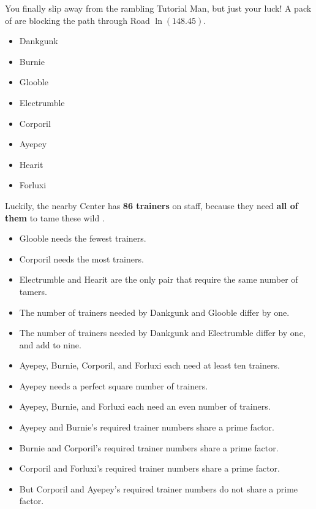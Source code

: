 

You finally slip away from the rambling Tutorial Man, but just your luck!
A pack of \mappMobimon{} are blocking the path
through Road \(\ln(148.45)\).

\begin{multicols}{2}
\begin{itemize}
  \item {Dankgunk}
  \item {Burnie}
  \item {Glooble}
  \item {Electrumble}
  \item {Corporil}
  \item {Ayepey}
  \item {Hearit}
  \item {Forluxi}
\end{itemize}
\end{multicols}

Luckily, the nearby \mappMobidash{} Center has \textbf{86 trainers} on staff,
because they need \textbf{all of them} to tame these wild \mappMobimon{}.

\begin{multicols}{2}
\begin{itemize}
\item Glooble needs the fewest trainers.
\item Corporil needs the most trainers.
\item Electrumble and Hearit are the only pair that require
      the same number of tamers.
\item The number of trainers needed by Dankgunk and Glooble differ by one.
\item The number of trainers needed by Dankgunk and Electrumble differ by one,
      and add to nine.
\item Ayepey, Burnie, Corporil, and Forluxi each need at least ten
      trainers.
\item Ayepey needs a perfect square number of trainers.
\item Ayepey, Burnie, and Forluxi each need an even number of trainers.
\item Ayepey and Burnie's required trainer numbers share a prime factor.
\item Burnie and Corporil's required trainer numbers share a prime factor.
\item Corporil and Forluxi's required trainer numbers share a prime factor.
\item But Corporil and Ayepey's required trainer numbers do not
      share a prime factor.
\end{itemize}
\end{multicols}


